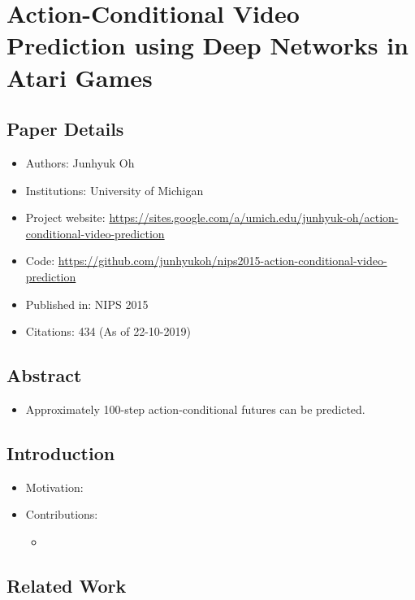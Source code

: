 \documentclass{article}
\begin{document}
    \section{Action-Conditional Video Prediction using Deep Networks in Atari Games}\label{sec:Action_Conditional_Video_Prediction_using_Deep_Networks_in_Atari_Games}
    \subsection*{Paper Details}
    \begin{itemize}
        \item Authors: Junhyuk Oh
        \item Institutions: University of Michigan
        \item Project website: \url{https://sites.google.com/a/umich.edu/junhyuk-oh/action-conditional-video-prediction}
        \item Code: \url{https://github.com/junhyukoh/nips2015-action-conditional-video-prediction}
        \item Published in: NIPS 2015
        \item Citations: 434 (As of 22-10-2019)
    \end{itemize}

    \subsection*{Abstract}
    \begin{itemize}
        \item Approximately 100-step action-conditional futures can be predicted.
    \end{itemize}

    \subsection{Introduction}\label{subsec:Action_Conditional_Video_Prediction_using_Deep_Networks_in_Atari_Games:introduction}
    \begin{itemize}
        \item Motivation:
        \item Contributions:
        \begin{itemize}
            \item
        \end{itemize}
    \end{itemize}

    \subsection{Related Work}\label{subsec:Action_Conditional_Video_Prediction_using_Deep_Networks_in_Atari_Games:related-work}
\end{document}
